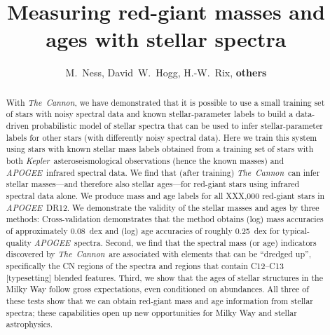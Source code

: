 \documentclass[12pt, preprint]{aastex}
\newcommand{\project}[1]{\textsl{#1}}
\newcommand{\thecannon}{\project{The~Cannon}}
\newcommand{\apogee}{\project{APOGEE}}
\newcommand{\kepler}{\project{Kepler}}
\begin{document}

\title{Measuring red-giant masses and ages with stellar spectra}
\author{M.~Ness,
David~W.~Hogg,
H.-W.~Rix,
\textbf{others}}

\begin{abstract}%
With \thecannon, we have demonstrated that it is possible to use a
small training set of stars with noisy spectral data and known
stellar-parameter labels to build a data-driven probabilistic model of
stellar spectra that can be used to infer stellar-parameter labels for
other stars (with differently noisy spectral data).
Here we train this system using stars with known stellar mass labels
obtained from a training set of stars with both
\kepler\ asteroseismological observations (hence the known masses) and
\apogee\ infrared spectral data.
We find that (after training) \thecannon\ can infer stellar
masses---and therefore also stellar ages---for red-giant stars using
infrared spectral data alone.
We produce mass and age labels for all XXX,000 red-giant stars in \apogee\ DR12.
We demonstrate the validity of the stellar masses and ages by three
methods:
Cross-validation demonstrates that the method obtains (log) mass accuracies of approximately 0.08~dex and (log) age accuracies
of roughly 0.25~dex for typical-quality \apogee\ spectra.
Second, we find that the spectral mass (or age) indicators
discovered by \thecannon\ are associated with elements that can be ``dredged up'',
specifically the CN regions of the spectra and regions that contain C12--C13 [typesetting] blended features. 
Third, we show that the ages of stellar structures in the
Milky Way follow gross expectations, even conditioned on abundances.
All three of these tests show that we can obtain red-giant mass and
age information from stellar spectra; these capabilities open up new
opportunities for Milky Way and stellar astrophysics.
\end{abstract}
\end{document}
